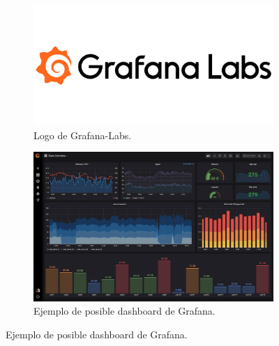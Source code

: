 \documentclass[11pt,a4paper,twoside]{report}
\begin{document}
\begin{figure}[hbtp]
	\centering
	\begin{subfigure}[b]{0.48\textwidth}
		\centering
		\includegraphics[width=\textwidth]{documento/16.png}
		\caption{Logo de Grafana-Labs.}
		\label{fig:grafana-logo}
	\end{subfigure}
	\hfill
	\begin{subfigure}[b]{0.48\textwidth}
		\centering
		\includegraphics[width=\textwidth]{documento/17.png}
		\caption{Ejemplo de posible dashboard de Grafana.}
		\label{fig:ejemplo-grafana}
	\end{subfigure}
\end{figure}
\end{document}
